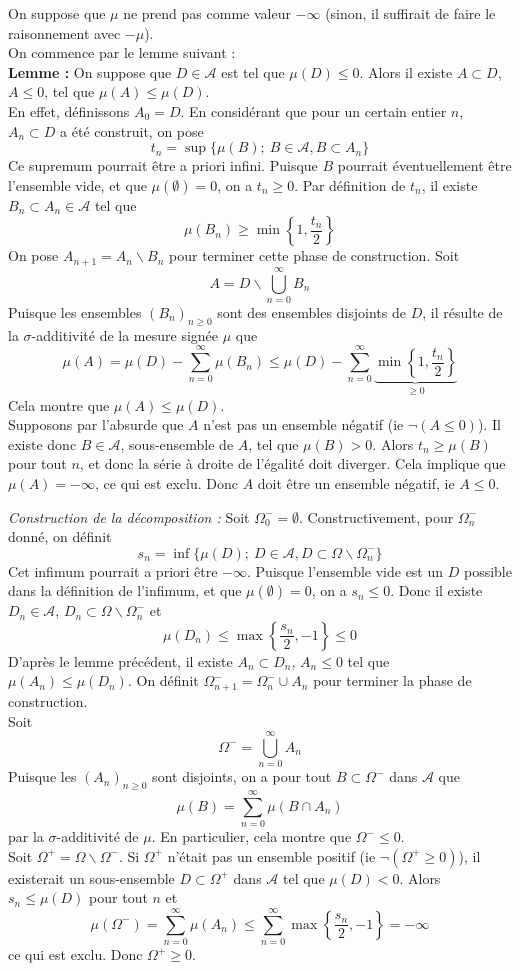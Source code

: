 \begin{dem}
On suppose que $\mu$ ne prend pas comme valeur $-\infty$ (sinon, il suffirait de faire le raisonnement avec $-\mu$).\\
On commence par le lemme suivant :\\
\textbf{Lemme :} On suppose que $D\in\mathcal{A}$ est tel que $\mu(D)\leq 0$. Alors il existe $A\subset D$, $A\leq 0$, tel que $\mu(A)\leq \mu(D)$.\\
En effet, définissons $A_0=D$. En considérant que pour un certain entier $n$, $A_n\subset D$ a été construit, on pose 
	\[t_n=\sup\{\mu(B);\ B\in\mathcal{A}, B\subset A_n\}\]
Ce supremum pourrait être a priori infini. Puisque $B$ pourrait éventuellement être l'ensemble vide, et que $\mu(\emptyset)=0$, on a $t_n\geq 0$. Par définition de $t_n$, il existe $B_n\subset A_n\in\mathcal{A}$ tel que 
	\[\mu(B_n)\geq\min\left\{1,\frac{t_n}{2}\right\}\]
On pose $A_{n+1}=A_n\backslash B_n$ pour terminer cette phase de construction. Soit \[A=D\backslash\bigcup_{n=0}^\infty B_n\]
Puisque les ensembles $(B_n)_{n\geq 0}$ sont des ensembles disjoints de $D$, il résulte de la $\sigma$-additivité de la mesure signée $\mu$ que
	\[\mu(A)=\mu(D)-\sum_{n=0}^\infty \mu(B_n)\leq \mu(D)-\sum_{n=0}^\infty \underbrace{\min\left\{1,\frac{t_n}{2}\right\}}_{\geq 0}\]
Cela montre que $\mu(A)\leq \mu(D)$.\\
Supposons par l'absurde que $A$ n'est pas un ensemble négatif (ie $\neg (A\leq 0)$). Il existe donc $B\in\mathcal{A}$, sous-ensemble de $A$, tel que $\mu(B)>0$. Alors $t_n\geq \mu(B)$ pour tout $n$, et donc la série à droite de l'égalité doit diverger. Cela implique que $\mu(A)=-\infty$, ce qui est exclu. Donc $A$ doit être un ensemble négatif, ie $A\leq 0$.

\bigskip
\textit{Construction de la décomposition :} Soit $\Omega_0^-=\emptyset$. Constructivement, pour $\Omega_n^-$ donné, on définit \[s_n=\inf\{\mu(D);\ D\in\mathcal{A}, D\subset \Omega\backslash\Omega_n^-\}\]
Cet infimum pourrait a priori être $-\infty$. Puisque l'ensemble vide est un $D$ possible dans la définition de l'infimum, et que $\mu(\emptyset)=0$, on a $s_n\leq 0$. Donc il existe $D_n\in\mathcal{A}$, $D_n\subset\Omega\backslash \Omega_n^-$ et \[\mu(D_n)\leq\max\left\{\frac{s_n}{2},-1\right\}\leq 0\]
D'après le lemme précédent, il existe $A_n\subset D_n$, $A_n\leq 0$ tel que $\mu(A_n)\leq \mu(D_n)$. On définit $\Omega_{n+1}^-=\Omega^-_n\cup A_n$ pour terminer la phase de construction.\\
Soit \[\Omega^-=\bigcup_{n=0}^\infty A_n\]
Puisque les $(A_n)_{n\geq 0}$ sont disjoints, on a pour tout $B\subset\Omega^-$ dans $\mathcal{A}$ que \[\mu(B)=\sum_{n=0}^\infty \mu(B\cap A_n)\]
par la $\sigma$-additivité de $\mu$. En particulier, cela montre que $\Omega^-\leq 0$. \\
Soit $\Omega^+=\Omega\backslash\Omega^-$. Si $\Omega^+$ n'était pas un ensemble positif (ie $\neg (\Omega^+\geq 0)$), il existerait un sous-ensemble $D\subset\Omega^+$ dans $\mathcal{A}$ tel que $\mu(D)<0$. Alors $s_n\leq \mu(D)$ pour tout $n$ et 
	\[\mu(\Omega^-)=\sum_{n=0}^\infty \mu(A_n)\leq \sum_{n=0}^\infty \max\left\{\frac{s_n}{2},-1\right\}=-\infty\]
ce qui est exclu. Donc $\Omega^+\geq 0$.


\end{dem}
